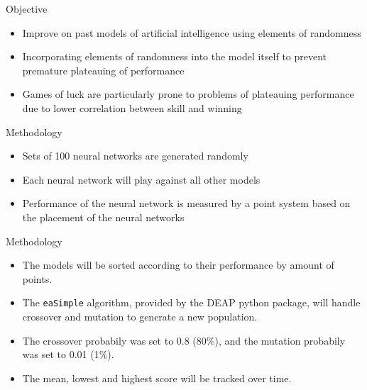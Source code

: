 \documentclass{beamer}
\begin{document}
\begin{frame}{Objective}
	
	\begin{itemize}
		
		\item Improve on past models of artificial intelligence using elements of randomness
		\item Incorporating elements of randomness into the model itself to prevent premature plateauing of performance
		\item Games of luck are particularly prone to problems of plateauing performance due to lower correlation between skill and winning
		
	\end{itemize}
	
\end{frame}


\begin{frame}{Methodology}
	
	\begin{itemize}
	
		\item Sets of 100 neural networks are generated randomly
		\item Each neural network will play against all other models
		\item Performance of the neural network is measured by a point system based on the placement of the neural networks
		
	\end{itemize}
	
\end{frame}

\begin{frame}{Methodology}
	
	\begin{itemize}
		
		\item The models will be sorted according to their performance by amount of points.
		\item The \texttt{eaSimple} algorithm, provided by the DEAP python package, will handle crossover and mutation to generate a new population.
		\item The crossover probabily was set to 0.8 (80\%), and the mutation probabily was set to 0.01 (1\%).
		\item The mean, lowest and highest score will be tracked over time.
	\end{itemize}
	
\end{frame}
\end{document}
